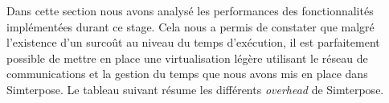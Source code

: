Dans cette section nous avons analysé les performances des fonctionnalités implémentées durant ce stage. Cela nous a permis de constater que malgré l'existence d'un surcoût au niveau du temps d'exécution, il est parfaitement possible de mettre en place une virtualisation légère utilisant le réseau de communications et la gestion du temps que nous avons mis en place dans Simterpose. Le tableau suivant résume les différents \textit{overhead} de Simterpose.

\begin{table}[H]
\centering
{}
\caption{\textit{Overhead} du temps d'exécution d'applications avec Simterpose et débit des échanges}
\label{global_overhead}
\end{table}

